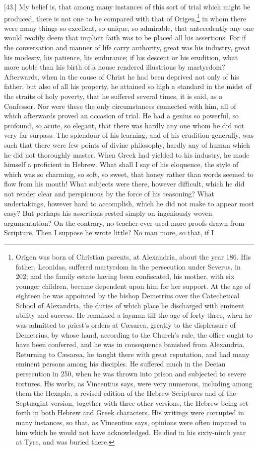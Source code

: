 [43.] My belief is, that among many instances of this sort of trial which might be produced, there is not one to be compared with that of Origen,\footnote{Origen was born of Christian parents, at Alexandria, about the year 186. His father, Leonidas, suffered martyrdom in the persecution under Severus, in 202; and the family estate having been confiscated, his mother, with six younger children, became dependent upon him for her support. At the age of eighteen he was appointed by the bishop Demetrius over the Catechetical School of Alexandria, the duties of which place he discharged with eminent ability and success. He remained a layman till the age of forty-three, when he was admitted to priest’s orders at Cæsarea, greatly to the displeasure of Demetrius, by whose hand, according to the Church’s rule, the office ought to have been conferred, and he was in consequence banished from Alexandria. Returning to Cæsarea, he taught there with great reputation, and had many eminent persons among his disciples. He suffered much in the Decian persecution in 250, when he was thrown into prison and subjected to severe tortures. His works, as Vincentius says, were very numerous, including among them the Hexapla, a revised edition of the Hebrew Scriptures and of the Septuagint version, together with three other versions, the Hebrew being set forth in both Hebrew and Greek characters. His writings were corrupted in many instances, so that, as Vincentius says, opinions were often imputed to him which he would not have acknowledged. He died in his sixty-ninth year at Tyre, and was buried there.} in whom there were many things so excellent, so unique, so admirable, that antecedently any one would readily deem that implicit faith was to be placed all his assertions. For if the conversation and manner of life carry authority, great was his industry, great his modesty, his patience, his endurance; if his descent or his erudition, what more noble than his birth of a house rendered illustrious by martyrdom? Afterwards, when in the cause of Christ he had been deprived not only of his father, but also of all his property, he attained so high a standard in the midst of the straits of holy poverty, that he suffered several times, it is said, as a Confessor. Nor were these the only circumstances connected with him, all of which afterwards proved an occasion of trial. He had a genius so powerful, so profound, so acute, so elegant, that there was hardly any one whom he did not very far surpass. The splendour of his learning, and of his erudition generally, was such that there were few points of divine philosophy, hardly any of human which he did not thoroughly master. When Greek had yielded to his industry, he made himself a proficient in Hebrew. What shall I say of his eloquence, the style of which was so charming, so soft, so sweet, that honey rather than words seemed to flow from his mouth! What subjects were there, however difficult, which he did not render clear and perspicuous by the force of his reasoning? What undertakings, however hard to accomplish, which he did not make to appear most easy? But perhaps his assertions rested simply on ingeniously woven argumentation? On the contrary, no teacher ever used more proofs drawn from Scripture. Then I suppose he wrote little? No man more, so that, if I 